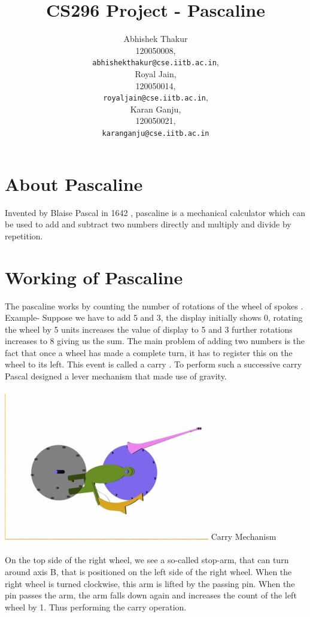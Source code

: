 \documentclass[11pt]{article}
\title{\textbf{CS296 Project - Pascaline}}
\author{Abhishek Thakur\\
120050008,\\
\texttt{abhishekthakur@cse.iitb.ac.in},\\
Royal Jain,\\
120050014,\\
\texttt{royaljain@cse.iitb.ac.in},\\
Karan Ganju,\\
120050021,\\
\texttt{karanganju@cse.iitb.ac.in}}
\begin{document}
\maketitle

\section{About Pascaline}
Invented by Blaise Pascal in 1642 , pascaline is a mechanical calculator which can be used to add and subtract two numbers directly and multiply and divide by repetition.

\section{Working of Pascaline}
The pascaline works by counting the number of rotations of the wheel of spokes \cite{Youtube}. Example- Suppose we have to add 5 and 3, the display initially shows 0, rotating the wheel by 5 units increases the value of display to 5 and 3 further rotations increases to 8 giving us the sum. The main problem of adding two numbers is the fact that once a wheel has made a complete turn, it has to register this on the wheel to its left. This event is called a carry . To perform such a successive carry Pascal designed a lever mechanism that made use of gravity. 
\\
\\
\includegraphics[scale=0.5]{../images/carry.png}
Carry Mechanism
\\
\\
 On the top side of the right wheel, we see a so-called stop-arm, that can turn around axis B, that is positioned on the left side of the right wheel. When the right wheel is turned clockwise, this arm is lifted by the passing pin. When the pin passes the arm, the arm falls down again and increases the count of the left wheel by 1. Thus performing the carry operation\cite{Article}.
\end{document}
